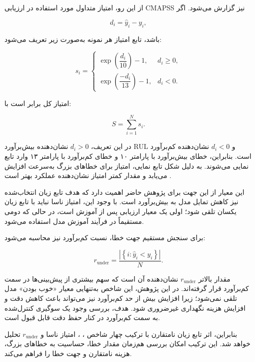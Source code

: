 \documentclass[a4paper,fleqn]{report}
\begin{document}
از این رو، امتیاز متداول مورد استفاده در ارزیابی CMAPSS نیز
گزارش می‌شود. اگر

\begin{equation}
	d_i=\hat{y}_i-y_i,
\end{equation}

باشد، تابع امتیاز هر نمونه به‌صورت زیر تعریف می‌شود:

\begin{equation}
	\label{eq:nasa-score}
	s_i
	=
	\begin{cases}
		\exp\left(\dfrac{d_i}{10}\right)-1,
		& d_i \geq 0,\\[8pt]
		\exp\left(\dfrac{-d_i}{13}\right)-1,
		& d_i < 0.
	\end{cases}
\end{equation}

امتیاز کل برابر است با:

\begin{equation}
	\label{eq:nasa-score-total}
	S
	=
	\sum_{i=1}^{N}s_i.
\end{equation}

در این تعریف، $d_i>0$ نشان‌دهنده بیش‌برآورد \gls{RUL} و
$d_i<0$ نشان‌دهنده کم‌برآورد است. بنابراین، خطای بیش‌برآورد با
پارامتر ۱۰ و خطای کم‌برآورد با پارامتر ۱۳ وارد تابع نمایی
می‌شوند. به دلیل شکل تابع نمایی، امتیاز برای خطاهای بزرگ به‌سرعت
افزایش می‌یابد و مقدار کمتر امتیاز نشان‌دهنده عملکرد بهتر است
\cite{NASA2007C-MAPSS}.

این معیار از این جهت برای پژوهش حاضر اهمیت دارد که هدف تابع
زیان انتخاب‌شده نیز کاهش تمایل مدل به بیش‌برآورد است. با وجود
این، امتیاز ناسا نباید با تابع زیان  یکسان تلقی شود؛
اولی یک معیار ارزیابی پس از آموزش است، در حالی که دومی مستقیماً
در فرآیند آموزش مدل استفاده می‌شود.

برای سنجش مستقیم جهت خطا، نسبت کم‌برآورد نیز محاسبه می‌شود:

\begin{equation}
	\label{eq:bias-ratio}
	r_{\mathrm{under}}
	=
	\frac{
		\left|
		\left\{
		i:\hat{y}_i<y_i
		\right\}
		\right|
	}{
		N
	}.
\end{equation}

مقدار بالاتر $r_{\mathrm{under}}$ نشان‌دهنده آن است که سهم بیشتری
از پیش‌بینی‌ها در سمت کم‌برآورد قرار گرفته‌اند. در این پژوهش،
این شاخص به‌تنهایی معیار «خوب بودن» مدل تلقی نمی‌شود؛ زیرا
افزایش بیش از حد کم‌برآورد نیز می‌تواند باعث کاهش دقت و افزایش
هزینه نگهداری غیرضروری شود. هدف، بررسی وجود یک سوگیری کنترل‌شده
به سمت کم‌برآورد در کنار حفظ دقت قابل قبول است.

بنابراین، اثر تابع زیان نامتقارن با ترکیب چهار شاخص
، ، امتیاز ناسا و $r_{\mathrm{under}}$ تحلیل
خواهد شد. این ترکیب امکان بررسی هم‌زمان مقدار خطا، حساسیت به
خطاهای بزرگ، هزینه نامتقارن و جهت خطا را فراهم می‌کند.
\end{document}
